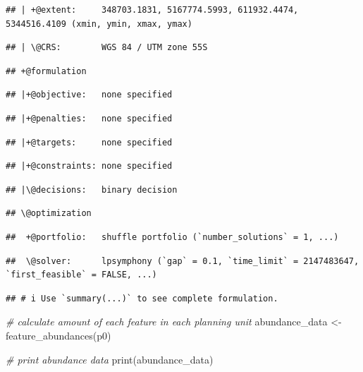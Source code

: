 \documentclass[
  12pt,
]{book}
\newenvironment{Shaded}{\begin{snugshade}}{\end{snugshade}}
\newcommand{\CommentTok}[1]{\textcolor[rgb]{0.56,0.35,0.01}{\textit{#1}}}
\newcommand{\FunctionTok}[1]{\textcolor[rgb]{0.00,0.00,0.00}{#1}}
\newcommand{\NormalTok}[1]{#1}
\newcommand{\OtherTok}[1]{\textcolor[rgb]{0.56,0.35,0.01}{#1}}
\begin{document}
\begin{verbatim}
## | +@extent:     348703.1831, 5167774.5993, 611932.4474, 5344516.4109 (xmin, ymin, xmax, ymax)
\end{verbatim}

\begin{verbatim}
## | \@CRS:        WGS 84 / UTM zone 55S
\end{verbatim}

\begin{verbatim}
## +@formulation
\end{verbatim}

\begin{verbatim}
## |+@objective:   none specified
\end{verbatim}

\begin{verbatim}
## |+@penalties:   none specified
\end{verbatim}

\begin{verbatim}
## |+@targets:     none specified
\end{verbatim}

\begin{verbatim}
## |+@constraints: none specified
\end{verbatim}

\begin{verbatim}
## |\@decisions:   binary decision
\end{verbatim}

\begin{verbatim}
## \@optimization
\end{verbatim}

\begin{verbatim}
##  +@portfolio:   shuffle portfolio (`number_solutions` = 1, ...)
\end{verbatim}

\begin{verbatim}
##  \@solver:      lpsymphony (`gap` = 0.1, `time_limit` = 2147483647, `first_feasible` = FALSE, ...)
\end{verbatim}

\begin{verbatim}
## # i Use `summary(...)` to see complete formulation.
\end{verbatim}

\begin{Shaded}
\begin{Highlighting}[]
\CommentTok{\# calculate amount of each feature in each planning unit}
\NormalTok{abundance\_data }\OtherTok{\textless{}{-}} \FunctionTok{feature\_abundances}\NormalTok{(p0)}

\CommentTok{\# print abundance data}
\FunctionTok{print}\NormalTok{(abundance\_data)}
\end{Highlighting}
\end{Shaded}
\end{document}
